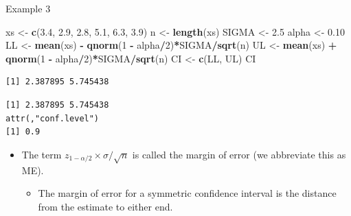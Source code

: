 \documentclass[
  ignorenonframetext,
]{beamer}
\newenvironment{Shaded}{\begin{snugshade}}{\end{snugshade}}
\newcommand{\AttributeTok}[1]{\textcolor[rgb]{0.13,0.29,0.53}{#1}}
\newcommand{\CommentTok}[1]{\textcolor[rgb]{0.56,0.35,0.01}{\textit{#1}}}
\newcommand{\DecValTok}[1]{\textcolor[rgb]{0.00,0.00,0.81}{#1}}
\newcommand{\FloatTok}[1]{\textcolor[rgb]{0.00,0.00,0.81}{#1}}
\newcommand{\FunctionTok}[1]{\textcolor[rgb]{0.13,0.29,0.53}{\textbf{#1}}}
\newcommand{\NormalTok}[1]{#1}
\newcommand{\OtherTok}[1]{\textcolor[rgb]{0.56,0.35,0.01}{#1}}
\newcommand{\SpecialCharTok}[1]{\textcolor[rgb]{0.81,0.36,0.00}{\textbf{#1}}}
\providecommand{\tightlist}{%
  \setlength{\itemsep}{0pt}\setlength{\parskip}{0pt}}
\begin{document}
\begin{frame}[fragile]{Example 3}
\label{example-3-1}
\small

\begin{Shaded}
\begin{Highlighting}[]
\NormalTok{xs }\OtherTok{\textless{}{-}} \FunctionTok{c}\NormalTok{(}\FloatTok{3.4}\NormalTok{, }\FloatTok{2.9}\NormalTok{, }\FloatTok{2.8}\NormalTok{, }\FloatTok{5.1}\NormalTok{, }\FloatTok{6.3}\NormalTok{, }\FloatTok{3.9}\NormalTok{)}
\NormalTok{n }\OtherTok{\textless{}{-}} \FunctionTok{length}\NormalTok{(xs)}
\NormalTok{SIGMA }\OtherTok{\textless{}{-}} \FloatTok{2.5}
\NormalTok{alpha }\OtherTok{\textless{}{-}} \FloatTok{0.10}
\NormalTok{LL }\OtherTok{\textless{}{-}} \FunctionTok{mean}\NormalTok{(xs) }\SpecialCharTok{{-}} \FunctionTok{qnorm}\NormalTok{(}\DecValTok{1} \SpecialCharTok{{-}}\NormalTok{ alpha}\SpecialCharTok{/}\DecValTok{2}\NormalTok{)}\SpecialCharTok{*}\NormalTok{SIGMA}\SpecialCharTok{/}\FunctionTok{sqrt}\NormalTok{(n)}
\NormalTok{UL }\OtherTok{\textless{}{-}} \FunctionTok{mean}\NormalTok{(xs) }\SpecialCharTok{+} \FunctionTok{qnorm}\NormalTok{(}\DecValTok{1} \SpecialCharTok{{-}}\NormalTok{ alpha}\SpecialCharTok{/}\DecValTok{2}\NormalTok{)}\SpecialCharTok{*}\NormalTok{SIGMA}\SpecialCharTok{/}\FunctionTok{sqrt}\NormalTok{(n)}
\NormalTok{CI }\OtherTok{\textless{}{-}} \FunctionTok{c}\NormalTok{(LL, UL)}
\NormalTok{CI}
\end{Highlighting}
\end{Shaded}

\begin{verbatim}
[1] 2.387895 5.745438
\end{verbatim}

\begin{Shaded}
\end{Shaded}

\begin{verbatim}
[1] 2.387895 5.745438
attr(,"conf.level")
[1] 0.9
\end{verbatim}

\normalsize

\begin{itemize}
\item
  The term \(z_{1-\alpha/2}\times \sigma/\sqrt{n}\) is called the margin
  of error (we abbreviate this as ME).

  \begin{itemize}
  \tightlist
  \item
    The margin of error for a symmetric confidence interval is the
    distance from the estimate to either end.
  \end{itemize}
\end{itemize}
\end{frame}
\end{document}
